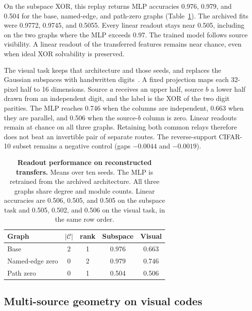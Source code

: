 On the subspace XOR, this replay returns MLP accuracies 0.976, 0.979, and
0.504 for the base, named-edge, and path-zero graphs
(Table~\ref{tab:executed}). The archived fits were 0.9772, 0.9745, and
0.5055. Every linear readout stays near 0.505, including on the two graphs
where the MLP exceeds 0.97. The trained model follows source visibility. A linear readout of the transferred features remains near chance, even when ideal XOR solvability is preserved.

The visual task keeps that architecture and those seeds, and replaces the Gaussian
subspaces with handwritten digits~\cite{optdigits1998}. A fixed projection maps
each 32-pixel half to 16 dimensions. Source $a$ receives an upper half, source
$b$ a lower half drawn from an independent digit, and the label is the XOR of
the two digit parities. The MLP reaches 0.746 when the columns are independent,
0.663 when they are parallel, and 0.506 when the source-$b$ column is zero.
Linear readouts remain at chance on all three graphs. Retaining both
common relays therefore does not beat an invertible pair of separate routes.
The reverse-support CIFAR-10 subset remains a negative control
(gaps $-0.0044$ and $-0.0019$).

\begin{table}[t]
\centering
\caption{\textbf{Readout performance on reconstructed transfers.}
Means over ten seeds. The MLP is retrained from the archived architecture.
All three graphs share degree and module counts. Linear
accuracies are 0.506, 0.505, and 0.505 on the subspace task and 0.505,
0.502, and 0.506 on the visual task, in the same row order.}
\label{tab:executed}
\small
\setlength{\tabcolsep}{3pt}
\begin{tabular}{@{}lcccc@{}}
\toprule
Graph & $|\mathcal C|$ & rank & Subspace & Visual \\
\midrule
Base & 2 & 1 & 0.976 & 0.663 \\
Named-edge zero & 0 & 2 & 0.979 & 0.746 \\
Path zero & 0 & 1 & 0.504 & 0.506 \\
\bottomrule
\end{tabular}
\end{table}

\subsection{Multi-source geometry on visual codes}
\label{sec:population}

